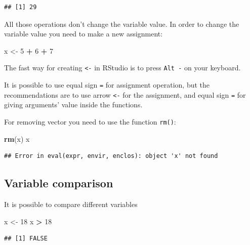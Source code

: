 \documentclass[
]{book}
\newenvironment{Shaded}{\begin{snugshade}}{\end{snugshade}}
\newcommand{\DecValTok}[1]{\textcolor[rgb]{0.00,0.00,0.81}{#1}}
\newcommand{\KeywordTok}[1]{\textcolor[rgb]{0.13,0.29,0.53}{\textbf{#1}}}
\newcommand{\NormalTok}[1]{#1}
\newcommand{\OperatorTok}[1]{\textcolor[rgb]{0.81,0.36,0.00}{\textbf{#1}}}
\newcommand{\StringTok}[1]{\textcolor[rgb]{0.31,0.60,0.02}{#1}}
\begin{document}
\begin{verbatim}
## [1] 29
\end{verbatim}

All those operations don't change the variable value. In order to change the variable value you need to make a new assignment:

\begin{Shaded}
\begin{Highlighting}[]
\NormalTok{x <-}\StringTok{ }\DecValTok{5} \OperatorTok{+}\StringTok{ }\DecValTok{6} \OperatorTok{+}\StringTok{ }\DecValTok{7}
\end{Highlighting}
\end{Shaded}

The fast way for creating \texttt{\textless{}-} in RStudio is to press \texttt{Alt\ -} on your keyboard.

It is possible to use equal sign \texttt{=} for assignment operation, but the recommendations are to use arrow \texttt{\textless{}-} for the assignment, and equal sign \texttt{=} for giving arguments' value inside the functions.

For removing vector you need to use the function \texttt{rm()}:

\begin{Shaded}
\begin{Highlighting}[]
\KeywordTok{rm}\NormalTok{(x)}
\NormalTok{x}
\end{Highlighting}
\end{Shaded}

\begin{verbatim}
## Error in eval(expr, envir, enclos): object 'x' not found
\end{verbatim}

\hypertarget{variable-comparison}{%
\subsection{Variable comparison}\label{variable-comparison}}

It is possible to compare different variables

\begin{Shaded}
\begin{Highlighting}[]
\NormalTok{x <-}\StringTok{ }\DecValTok{18}
\NormalTok{x }\OperatorTok{>}\StringTok{ }\DecValTok{18}
\end{Highlighting}
\end{Shaded}

\begin{verbatim}
## [1] FALSE
\end{verbatim}
\end{document}

